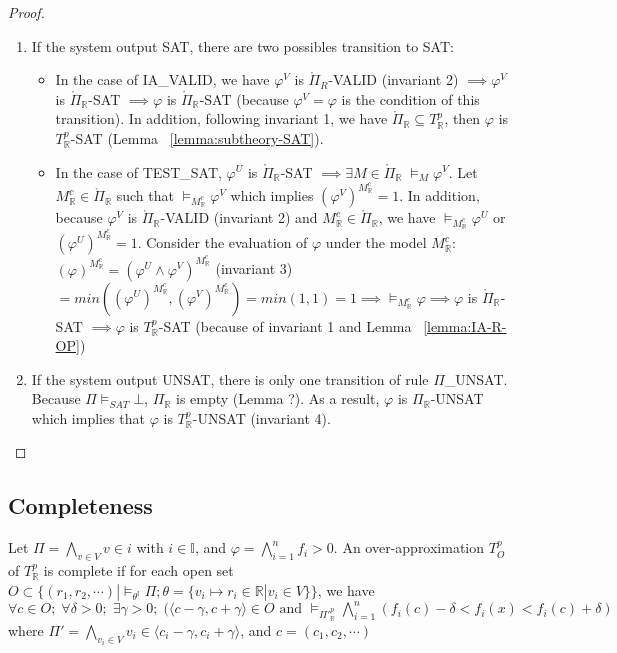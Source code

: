 \begin{proof}
\begin{enumerate}
\item If the system output SAT, there are two possibles transition to SAT:
\begin{itemize}
\item In the case of IA\_VALID, we have $\varphi^V$ is $\mathring{\Pi}_{R}$-VALID (invariant 2) $\implies \varphi^V$ is $\mathring{\Pi}_\mathbb{R}$-SAT $\implies \varphi$ is $\mathring{\Pi}_\mathbb{R}$-SAT (because $\varphi^V = \varphi$ is the condition of this transition). In addition, following invariant 1, we have $\mathring{\Pi}_\mathbb{R} \subseteq T^p_\mathbb{R}$, then $\varphi$ is $T^p_\mathbb{R}$-SAT (Lemma ~\ref{lemma:subtheory-SAT}).
\item \sloppy In the case of TEST\_SAT, $\varphi^U$ is $\mathring{\Pi}_\mathbb{R}$-SAT $\implies \exists M \in \mathring{\Pi}_\mathbb{R} \; \models_M \varphi^V$. Let ${M^c_\mathbb{R} \in \mathring{\Pi}_\mathbb{R}}$ such that $\models_{M^c_\mathbb{R}} \varphi^V$ which implies $(\varphi^V)^{M^c_\mathbb{R}} = 1$. In addition, because $\varphi^V$ is $\mathring{\Pi}_\mathbb{R}$-VALID (invariant 2) and $M^c_\mathbb{R} \in \mathring{\Pi}_\mathbb{R}$, we have $\models_{M^c_\mathbb{R}} \varphi^U$ or ${(\varphi^U)^{M^c_\mathbb{R}} = 1}$. Consider the evaluation of $\varphi$ under the model $M^c_\mathbb{R}$: ${(\varphi)^{M^c_\mathbb{R}} = (\varphi^U \wedge \varphi^V)^{M^c_\mathbb{R}}}$ (invariant 3) $= min((\varphi^U)^{M^c_\mathbb{R}}, (\varphi^V)^{M^c_\mathbb{R}}) = min(1, 1) = 1 \implies \models_{M^c_\mathbb{R}} \varphi \implies \varphi$ is $\mathring{\Pi}_\mathbb{R}$-SAT $\implies \varphi$ is $T^p_\mathbb{R}$-SAT (because of invariant 1 and Lemma ~\ref{lemma:IA-R-OP})
\end{itemize}
\item  If the system output UNSAT, there is only one transition of rule $\Pi$\_UNSAT. Because $\Pi \models_{SAT} \bot$, $\Pi_\mathbb{R}$ is empty (Lemma ?). As a result, $\varphi$ is $\Pi_\mathbb{R}$-UNSAT which implies that $\varphi$ is $T^p_\mathbb{R}$-UNSAT (invariant 4).
\end{enumerate}
\end{proof}

\subsection{Completeness}
\begin{definition} \label{def:OT-complete}
\sloppy
Let $\Pi = \bigwedge\limits_{v \in V} v \in i$ with $i \in \mathbb{I}$, and ${\varphi = \bigwedge\limits_{i=1}^n f_i > 0}$. An over-approximation $T^p_O$ of $T^p_\mathbb{R}$ is complete if for each open set ${O \subset \{(r_1,r_2,\cdots) |  \models_{\theta^\mathbb{I}} \Pi; \theta = \{v_i \mapsto r_i \in \mathbb{R} | v_i  \in V\}\}}$, we have ${\forall c \in O; \; \forall \delta > 0; \; \exists \gamma > 0; \; (\langle c - \gamma, c + \gamma \rangle \in O \text{ and } \models_{\Pi'^p_\mathbb{R}} \bigwedge\limits_{i=1}^n(f_i(c)-\delta < f_i(x) < f_i(c) + \delta)}$ where ${\Pi' = \bigwedge\limits_{v_i \in V} v_i \in \langle c_i - \gamma, c_i + \gamma \rangle}$, and ${c = (c_1, c_2, \cdots)}$
\end{definition}

